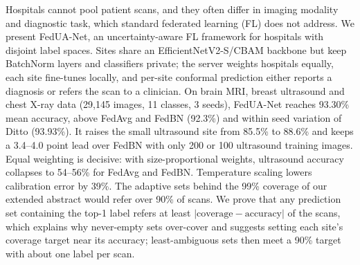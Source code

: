 Hospitals cannot pool patient scans, and they often differ in imaging modality and diagnostic task, which standard federated learning (FL) does not address. We present FedUA-Net, an uncertainty-aware FL framework for hospitals with disjoint label spaces. Sites share an EfficientNetV2-S/CBAM backbone but keep BatchNorm layers and classifiers private; the server weights hospitals equally, each site fine-tunes locally, and per-site conformal prediction either reports a diagnosis or refers the scan to a clinician. On brain MRI, breast ultrasound and chest X-ray data (29,145 images, 11 classes, 3 seeds), FedUA-Net reaches 93.30\% mean accuracy, above FedAvg and FedBN (92.3\%) and within seed variation of Ditto (93.93\%). It raises the small ultrasound site from 85.5\% to 88.6\% and keeps a 3.4--4.0 point lead over FedBN with only 200 or 100 ultrasound training images. Equal weighting is decisive: with size-proportional weights, ultrasound accuracy collapses to 54--56\% for FedAvg and FedBN. Temperature scaling lowers calibration error by 39\%. The adaptive sets behind the 99\% coverage of our extended abstract would refer over 90\% of scans. We prove that any prediction set containing the top-1 label refers at least $|\text{coverage}-\text{accuracy}|$ of the scans, which explains why never-empty sets over-cover and suggests setting each site's coverage target near its accuracy; least-ambiguous sets then meet a 90\% target with about one label per scan.
